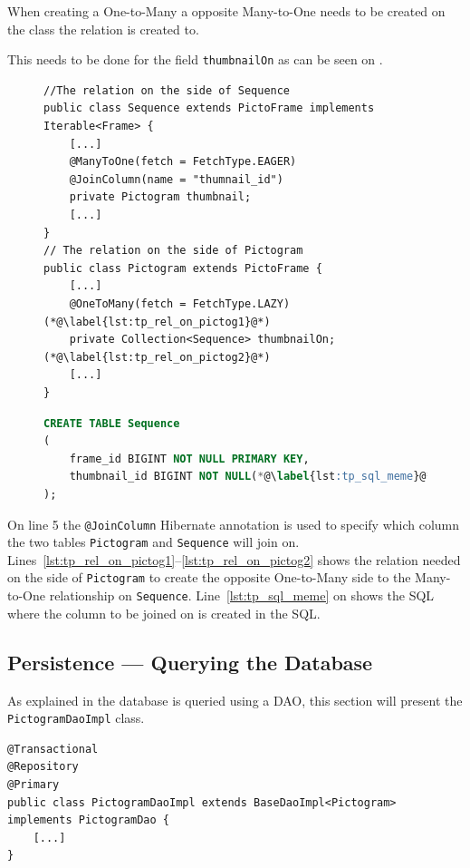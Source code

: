 When creating a One-to-Many a opposite Many-to-One needs to be created on the class the relation is created to.

This needs to be done for the field \texttt{thumbnailOn} as can be seen on .
\begin{figure}[!htb]
\begin{lstlisting}[caption={Fields with annotations which causes Hibernate to perfrm the ORM.}, label={lst:titlePictogram}]
//The relation on the side of Sequence
public class Sequence extends PictoFrame implements Iterable<Frame> {
    [...]
    @ManyToOne(fetch = FetchType.EAGER)
    @JoinColumn(name = "thumnail_id")
    private Pictogram thumbnail;
    [...]
}
// The relation on the side of Pictogram
public class Pictogram extends PictoFrame {
    [...]
    @OneToMany(fetch = FetchType.LAZY)(*@\label{lst:tp_rel_on_pictog1}@*)
    private Collection<Sequence> thumbnailOn;(*@\label{lst:tp_rel_on_pictog2}@*)
    [...]
}

\end{lstlisting}
\begin{lstlisting}[language=SQL,caption={The SQL save the keys for thumbnails for sequences.},label={lst:sqltitlepictogram}]
CREATE TABLE Sequence
(
    frame_id BIGINT NOT NULL PRIMARY KEY,
    thumbnail_id BIGINT NOT NULL(*@\label{lst:tp_sql_meme}@*)
);
\end{lstlisting}
\end{figure}

On line 5 the \texttt{@JoinColumn} Hibernate annotation is used to specify which column the two tables \texttt{Pictogram} and \texttt{Sequence} will join on.
Lines~\ref{lst:tp_rel_on_pictog1}--\ref{lst:tp_rel_on_pictog2} shows the relation needed on the side of \texttt{Pictogram} to create the opposite One-to-Many side to the Many-to-One relationship on \texttt{Sequence}.
Line~\ref{lst:tp_sql_meme} on  shows the SQL where the column to be joined on is created in the SQL.

\subsection{Persistence --- Querying the Database}
As explained in  the database is queried using a DAO, this section will present the \texttt{PictogramDaoImpl} class.

\begin{lstlisting}[float, floatplacement=h, caption={The class header of the \texttt{PictogramDao}, along with its annotations.},label={lst:pictogramDaoImpl}]
@Transactional
@Repository
@Primary
public class PictogramDaoImpl extends BaseDaoImpl<Pictogram> implements PictogramDao {
    [...]
}
\end{lstlisting}

